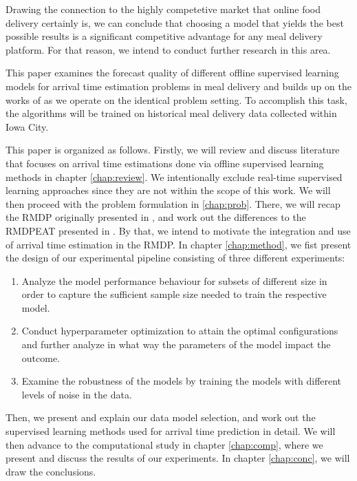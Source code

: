 Drawing the connection to the highly competetive market that online food delivery certainly is, we can conclude that choosing a model that yields the best possible results is a significant competitive advantage for any meal delivery platform. For that reason, we intend to conduct further research in this area.

This paper examines the forecast quality of different offline supervised learning models for arrival time estimation problems in meal delivery and builds up on the works of \cite{Hildebrandt2020_EAT} as we operate on the identical problem setting. To accomplish this task, the algorithms will be trained on historical meal delivery data collected within Iowa City. 

This paper is organized as follows. Firstly, we will review and discuss literature that focuses on arrival time estimations done via offline supervised learning methods in chapter \ref{chap:review}. We intentionally exclude real-time supervised learning approaches since they are not within the scope of this work. We will then proceed with the problem formulation in \ref{chap:prob}. There, we will recap the RMDP originally presented in \cite{UlmerRMDP}, and work out the differences to the RMDPEAT presented in \cite{Hildebrandt2020_EAT}. By that, we intend to motivate the integration and use of arrival time estimation in the RMDP. In chapter \ref{chap:method}, we fist present the design of our experimental pipeline consisting of three different experiments:
\begin{enumerate}
	\item Analyze the model performance behaviour for subsets of different size in order to capture the sufficient sample size needed to train the respective model.
	\item Conduct hyperparameter optimization to attain the optimal configurations and further analyze in what way the parameters of the model impact the outcome. 
	\item Examine the robustness of the models by training the models with different levels of noise in the data.
\end{enumerate}
Then, we present and explain our data model selection, and work out the supervised learning methods used for arrival time prediction in detail. We will then advance to the computational study in chapter \ref{chap:comp}, where we present and discuss the results of our experiments.
In chapter \ref{chap:conc}, we will draw the conclusions.
 